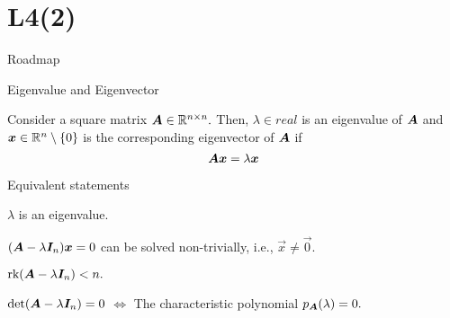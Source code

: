 \documentclass[fleqn,aspectratio=169]{beamer}
\begin{document}
\section{L4(2)}
\begin{frame}{Roadmap}

\plitemsep 0.1in

\bce[(1)] 
\item {}

\item {}

\item {}

\ece
\end{frame}

\begin{frame}{Eigenvalue and Eigenvector}

\plitemsep 0.1in

\bci
\item {} Consider a square matrix $\bm{A} \in {\mathbb R}^{n \times n}.$ Then, $\lambda \in real$ is an eigenvalue of $\bm{A}$ and $\bm{x} \in {\mathbb R}^n \setminus \{0 \}$ is the corresponding eigenvector of $\bm{A}$ if 
$$
\bm{A} \bm{x} = \lambda \bm{x}
$$

\item Equivalent statements
\bci
\item $\lambda$ is an eigenvalue.
\item $(\bm{A} - \lambda \bm{I}_n)\bm{x}=0$ can be solved non-trivially, i.e., $\vec{x} \neq \vec{0}.$
\item $\text{rk}(\bm{A} - \lambda\bm{I}_n) < n.$
\item $\det(\bm{A} - \lambda\bm{I}_n) =0$ $\Longleftrightarrow$ The characteristic polynomial $p_{\bm{A}}(\lambda)=0.$
\eci
\eci
\end{frame}
\end{document}
